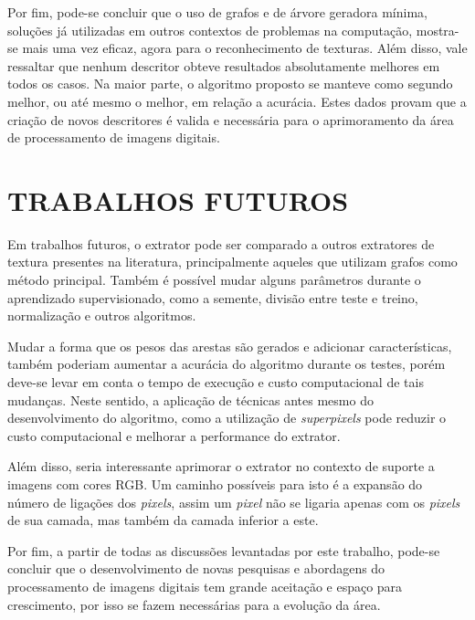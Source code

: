\par Por fim, pode-se concluir que o uso de grafos e de árvore geradora mínima, soluções já utilizadas em outros contextos de problemas na computação, mostra-se mais uma vez eficaz, agora para o reconhecimento de texturas. Além disso, vale ressaltar que nenhum descritor obteve resultados absolutamente melhores em todos os casos. Na maior parte, o algoritmo proposto se manteve como segundo melhor, ou até mesmo o melhor, em relação a acurácia. Estes dados provam que a criação de novos descritores é valida e necessária para o aprimoramento da área de processamento de imagens digitais.

\section{TRABALHOS FUTUROS}
\label{sec:trabalhosFuturos}

\par Em trabalhos futuros, o extrator pode ser comparado a outros extratores de textura presentes na literatura, principalmente aqueles que utilizam grafos como método principal. Também é possível mudar alguns parâmetros durante o aprendizado supervisionado, como a semente, divisão entre teste e treino, normalização e outros algoritmos.

\par Mudar a forma que os pesos das arestas são gerados e adicionar características, também poderiam aumentar a acurácia do algoritmo durante os testes, porém deve-se levar em conta o tempo de execução e custo computacional de tais mudanças. Neste sentido, a aplicação de técnicas antes mesmo do desenvolvimento do algoritmo, como a utilização de \textit{superpixels} pode reduzir o custo computacional e melhorar a performance do extrator.

\par Além disso, seria interessante aprimorar o extrator no contexto de suporte a imagens com cores RGB. Um caminho possíveis para isto é a expansão do número de ligações dos \textit{pixels}, assim um \textit{pixel} não se ligaria apenas com os \textit{pixels} de sua camada, mas também da camada inferior a este.

\par Por fim, a partir de todas as discussões levantadas por este trabalho, pode-se concluir que o desenvolvimento de novas pesquisas e abordagens do processamento de imagens digitais tem grande aceitação e espaço para crescimento, por isso se fazem necessárias para a evolução da área.

